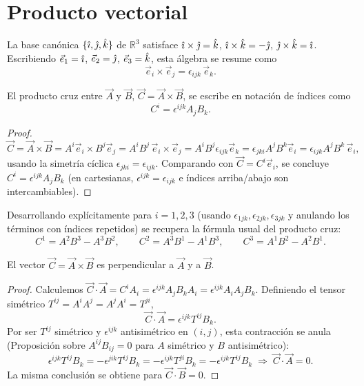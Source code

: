 \section{Producto vectorial}

La base canónica $\{\hat{\imath},\hat{\jmath},\hat{k}\}$ de $\mathbb{R}^3$ satisface
$\hat{\imath}\times\hat{\jmath}=\hat{k}$, $\hat{\imath}\times\hat{k}=-\hat{\jmath}$,
$\hat{\jmath}\times\hat{k}=\hat{\imath}$. Escribiendo $\vec e_1=\hat{\imath}$, $\vec
e_2=\hat{\jmath}$, $\vec e_3=\hat{k}$, esta álgebra se resume como
\[
\vec e_i \times \vec e_j = \epsilon_{ijk}\, \vec e_k .
\]

\begin{proposicionc}
El producto cruz entre $\vec A$ y $\vec B$, $\vec C = \vec A\times\vec
B$, se escribe en notación de índices como
\[
C^i = \epsilon^{ijk}A_jB_k .
\]
\end{proposicionc}

\begin{proof}
\[
\vec C = \vec A\times\vec B = A^i\vec e_i\times B^j\vec e_j = A^iB^j\,
\vec e_i\times\vec e_j = A^iB^j\epsilon_{ijk}\vec e_k = \epsilon_{jki}
A^jB^k \vec e_i = \epsilon_{ijk}A^jB^k\, \vec e_i,
\]
usando la simetría cíclica $\epsilon_{jki}=\epsilon_{ijk}$. Comparando
con $\vec C = C^i\vec e_i$, se concluye $C^i = \epsilon^{ijk}A_jB_k$
(en cartesianas, $\epsilon^{ijk}=\epsilon_{ijk}$ e índices arriba/abajo
son intercambiables). \qedhere
\end{proof}

\begin{ejemplo}
Desarrollando explícitamente para $i=1,2,3$ (usando
$\epsilon_{1jk},\epsilon_{2jk},\epsilon_{3jk}$ y anulando los términos
con índices repetidos) se recupera la fórmula usual del producto cruz:
\[
C^1 = A^2B^3-A^3B^2, \qquad C^2 = A^3B^1-A^1B^3, \qquad C^3 =
A^1B^2-A^2B^1.
\]
\end{ejemplo}

\begin{proposicionc}
El vector $\vec C=\vec A\times\vec B$ es perpendicular a $\vec A$ y a
$\vec B$.
\end{proposicionc}

\begin{proof}
Calculemos $\vec C\cdot\vec A = C^iA_i = \epsilon^{ijk}A_jB_kA_i =
\epsilon^{ijk}A_iA_jB_k$. Definiendo el tensor simétrico
$T^{ij}=A^iA^j=A^jA^i=T^{ji}$,
\[
\vec C\cdot\vec A = \epsilon^{ijk}T^{ij}B_k .
\]
Por ser $T^{ij}$ simétrico y $\epsilon^{ijk}$ antisimétrico en $(i,j)$,
esta contracción se anula (Proposición sobre $A^{ij}B_{ij}=0$ para $A$
simétrico y $B$ antisimétrico):
\[
\epsilon^{ijk}T^{ij}B_k = -\epsilon^{jik}T^{ij}B_k = -\epsilon^{ijk}
T^{ji}B_k = -\epsilon^{ijk}T^{ij}B_k \;\Rightarrow\; \vec C\cdot\vec A =
0 .
\]
La misma conclusión se obtiene para $\vec C\cdot\vec B=0$. \qedhere
\end{proof}

